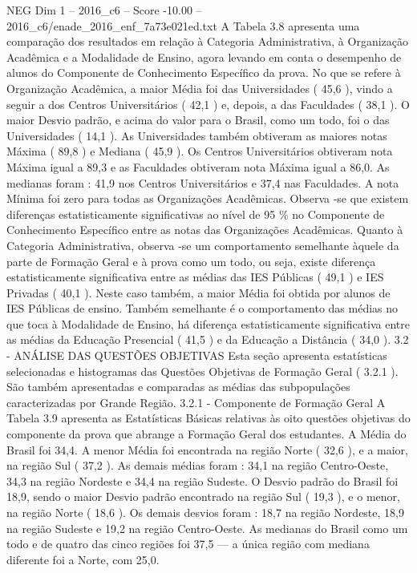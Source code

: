 \begin{textsample}{NEG Dim 1 – 2016\_c6 – Score -10.00 – 2016\_c6/enade\_2016\_enf\_7a73e021ed.txt}
A Tabela 3.8 apresenta uma comparação dos resultados em relação à Categoria Administrativa, à Organização Acadêmica e a Modalidade de Ensino, agora levando em conta o desempenho de alunos do Componente de Conhecimento Específico da prova.
No que se refere à Organização Acadêmica, a maior Média foi das Universidades ( 45,6 ), vindo a seguir a dos Centros Universitários ( 42,1 ) e, depois, a das Faculdades ( 38,1 ).
O maior Desvio padrão, e acima do valor para o Brasil, como um todo, foi o das Universidades ( 14,1 ).
As Universidades também obtiveram as maiores notas Máxima ( 89,8 ) e Mediana ( 45,9 ).
Os Centros Universitários obtiveram nota Máxima igual a 89,3 e as Faculdades obtiveram nota Máxima igual a 86,0.
As medianas foram : 41,9 nos Centros Universitários e 37,4 nas Faculdades.
A nota Mínima foi zero para todas as Organizações Acadêmicas.
Observa -se que existem diferenças estatisticamente significativas ao nível de 95 \% no Componente de Conhecimento Específico entre as notas das Organizações Acadêmicas.
Quanto à Categoria Administrativa, observa -se um comportamento semelhante àquele da parte de Formação Geral e à prova como um todo, ou seja, existe diferença estatisticamente significativa entre as médias das IES Públicas ( 49,1 ) e IES Privadas ( 40,1 ).
Neste caso também, a maior Média foi obtida por alunos de IES Públicas de ensino.
Também semelhante é o comportamento das médias no que toca à Modalidade de Ensino, há diferença estatisticamente significativa entre as médias da Educação Presencial ( 41,5 ) e da Educação a Distância ( 34,0 ). 3.2 - ANÁLISE DAS QUESTÕES OBJETIVAS Esta seção apresenta estatísticas selecionadas e histogramas das Questões Objetivas de Formação Geral ( 3.2.1 ).
São também apresentadas e comparadas as médias das subpopulações caracterizadas por Grande Região. 3.2.1 - Componente de Formação Geral A Tabela 3.9 apresenta as Estatísticas Básicas relativas às oito questões objetivas do componente da prova que abrange a Formação Geral dos estudantes.
A Média do Brasil foi 34,4.
A menor Média foi encontrada na região Norte ( 32,6 ), e a maior, na região Sul ( 37,2 ).
As demais médias foram : 34,1 na região Centro-Oeste, 34,3 na região Nordeste e 34,4 na região Sudeste.
O Desvio padrão do Brasil foi 18,9, sendo o maior Desvio padrão encontrado na região Sul ( 19,3 ), e o menor, na região Norte ( 18,6 ).
Os demais desvios foram : 18,7 na região Nordeste, 18,9 na região Sudeste e 19,2 na região Centro-Oeste.
As medianas do Brasil como um todo e de quatro das cinco regiões foi 37,5 — a única região com mediana diferente foi a Norte, com 25,0.

\end{textsample}
